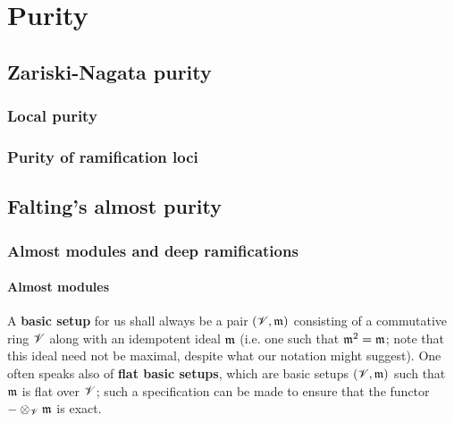 \chapter{Purity}
    \begin{abstract}
        
    \end{abstract}
    
    \minitoc
    
    \section{Zariski-Nagata purity}
        \subsection{Local purity}
        
        \subsection{Purity of ramification loci}
    
    \section{Falting's almost purity}
        \subsection{Almost modules and deep ramifications}
            \subsubsection{Almost modules}
                \begin{convention} \label{conv: basic_setups}
                    A \textbf{basic setup} for us shall always be a pair $(\mathscr{V}, \mathfrak{m})$ consisting of a commutative ring $\mathscr{V}$ along with an idempotent ideal $\mathfrak{m}$ (i.e. one such that $\mathfrak{m}^2 = \mathfrak{m}$; note that this ideal need not be maximal, despite what our notation might suggest). One often speaks also of \textbf{flat basic setups}, which are basic setups $(\mathscr{V}, \mathfrak{m})$ such that $\mathfrak{m}$ is flat over $\mathscr{V}$; such a specification can be made to ensure that the functor $- \tensor_{\scrV} \m$ is exact.
                \end{convention}
                
